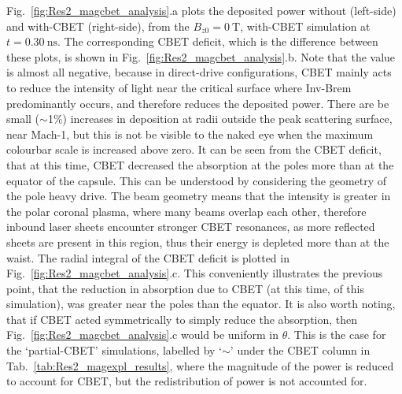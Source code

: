 Fig.~\ref{fig:Res2_magcbet_analysis}.a plots the deposited power without (left-side) and with-\ac{CBET} (right-side), from the $B_{z0}=0\ \text{T}$, with-\ac{CBET} simulation at $t=0.30\ \text{ns}$.
The corresponding \ac{CBET} deficit, which is the difference between these plots, is shown in Fig.~\ref{fig:Res2_magcbet_analysis}.b.
Note that the value is almost all negative, because in direct-drive configurations, \ac{CBET} mainly acts to reduce the intensity of light near the critical surface where \ac{Inv-Brem} predominantly occurs, and therefore reduces the deposited power.
There are be small ($\sim$1\%) increases in deposition at radii outside the peak scattering surface, near Mach-1, but this is not be visible to the naked eye when the maximum colourbar scale is increased above zero.
It can be seen from the \ac{CBET} deficit, that at this time, \ac{CBET} decreased the absorption at the poles more than at the equator of the capsule.
This can be understood by considering the geometry of the pole heavy drive.
The beam geometry means that the intensity is greater in the polar coronal plasma, where many beams overlap each other, therefore inbound laser sheets encounter stronger \ac{CBET} resonances, as more reflected sheets are present in this region, thus their energy is depleted more than at the waist.
The radial integral of the \ac{CBET} deficit is plotted in Fig.~\ref{fig:Res2_magcbet_analysis}.c.
This conveniently illustrates the previous point, that the reduction in absorption due to \ac{CBET} (at this time, of this simulation), was greater near the poles than the equator.
It is also worth noting, that if \ac{CBET} acted symmetrically to simply reduce the absorption, then Fig.~\ref{fig:Res2_magcbet_analysis}.c would be uniform in $\theta$.
This is the case for the `partial-\ac{CBET}' simulations, labelled by `$\sim$' under the \ac{CBET} column in Tab.~\ref{tab:Res2_magexpl_results}, where the magnitude of the power is reduced to account for \ac{CBET}, but the redistribution of power is not accounted for.

